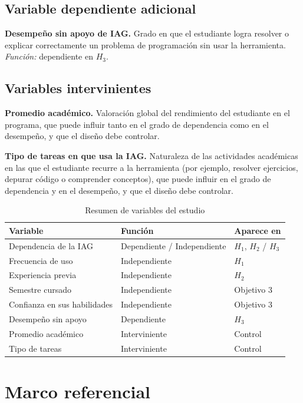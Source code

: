 \documentclass[12pt,letterpaper]{article}
\begin{document}
\subsection{Variable dependiente adicional}

\textbf{Desempeño sin apoyo de IAG.} Grado en que el estudiante logra resolver o explicar correctamente un problema de programación sin usar la herramienta. \emph{Función:} dependiente en $H_3$.

\subsection{Variables intervinientes}

\textbf{Promedio académico.} Valoración global del rendimiento del estudiante en el programa, que puede influir tanto en el grado de dependencia como en el desempeño, y que el diseño debe controlar.

\textbf{Tipo de tareas en que usa la IAG.} Naturaleza de las actividades académicas en las que el estudiante recurre a la herramienta (por ejemplo, resolver ejercicios, depurar código o comprender conceptos), que puede influir en el grado de dependencia y en el desempeño, y que el diseño debe controlar.

\begin{table}[ht]
\centering
\caption{Resumen de variables del estudio}
\label{tab:variables}
\small
\begin{tabular}{@{}p{5cm}p{3.6cm}p{3.6cm}@{}}
\toprule
\textbf{Variable} & \textbf{Función} & \textbf{Aparece en} \\
\midrule
Dependencia de la IAG & Dependiente / Independiente & $H_1$, $H_2$ / $H_3$ \\
Frecuencia de uso & Independiente & $H_1$ \\
Experiencia previa & Independiente & $H_2$ \\
Semestre cursado & Independiente & Objetivo 3 \\
Confianza en sus habilidades & Independiente & Objetivo 3 \\
Desempeño sin apoyo & Dependiente & $H_3$ \\
Promedio académico & Interviniente & Control \\
Tipo de tareas & Interviniente & Control \\
\bottomrule
\end{tabular}
\end{table}

\section{Marco referencial}
\end{document}
